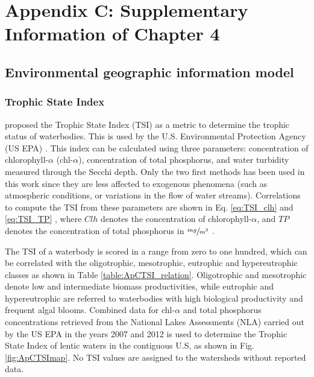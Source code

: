 \chapter{Appendix C: Supplementary Information of Chapter 4}

\begin{refsection}[referencesCh4]
\section{Environmental geographic information model}
\subsection{Trophic State Index}
\citet{carlson_trophic_1977} proposed the Trophic State Index (TSI) as a metric to determine the trophic status of waterbodies. This is used by the U.S. Environmental Protection Agency (US EPA) \citep{QAPP2012}. This index can be calculated using three parameters: concentration of chlorophyll-$\alpha$ (chl-$\alpha$), concentration of total phosphorus, and water turbidity measured through the Secchi depth. Only the two first methods has been used in this work since they are less affected to exogenous phenomena (such as atmospheric conditions, or variations in the flow of water streams). Correlations to compute the TSI from these parameters are shown in Eq. \ref{eq:TSI_clh} and \ref{eq:TSI_TP} , where $Clh$ denotes the concentration of chlorophyll-$\alpha$, and $TP$ denotes the concentration of total phosphorus in $\sfrac{mg}{m^3}$ \citep{carlson_trophic_1977}. 

The TSI of a waterbody is scored in a range from zero to one hundred, which can be correlated with the oligotrophic, mesotrophic, eutrophic and hypereutrophic classes as shown in Table \ref{table:ApCTSI_relation}. Oligotrophic and mesotrophic denote low and intermediate biomass productivities, while eutrophic and hypereutrophic are referred to waterbodies with high biological productivity and frequent algal blooms. Combined data for chl-$\alpha$ and total phosphorus concentrations retrieved from the National Lakes Assessments (NLA) carried out by the US EPA in the years 2007 and 2012 \citep{NLA2012, NLA2007} is used to determine the Trophic State Index of lentic waters in the contiguous U.S, as shown in Fig. \ref{fig:ApCTSImap}. No TSI values are assigned to the watersheds without reported data.


\end{refsection}
